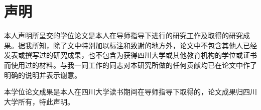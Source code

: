 

\chapter{声\hspace{1em}明}
本人声明所呈交的学位论文是本人在导师指导下进行的研究工作及取得的研究成果。据我所知，除了文中特别加以标注和致谢的地方外，论文中不包含其他人已经发表或撰写过的研究成果，也不包含为获得四川大学或其他教育机构的学位或证书而使用过的材料。与我一同工作的同志对本研究所做的任何贡献均已在论文中作了明确的说明并表示谢意。


本学位论文成果是本人在四川大学读书期间在导师指导下取得的，论文成果归四川大学所有，特此声明。
\vspace{4cm}
\autograph
